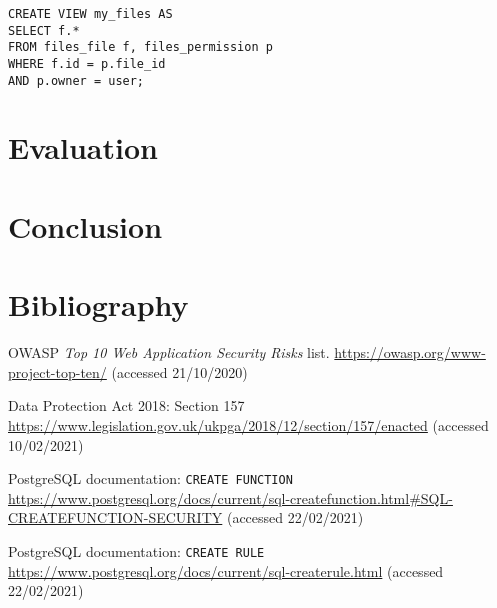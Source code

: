\documentclass{article}
\begin{document}
\begin{verbatim}
CREATE VIEW my_files AS
SELECT f.*
FROM files_file f, files_permission p
WHERE f.id = p.file_id
AND p.owner = user;
\end{verbatim}

\section{Evaluation}

\section{Conclusion}

\section*{Bibliography}
\begin{thebibliography}{9}
 OWASP \textit{Top 10 Web Application Security Risks} list. \url{https://owasp.org/www-project-top-ten/} (accessed 21/10/2020)

 Data Protection Act 2018: Section 157 \url{https://www.legislation.gov.uk/ukpga/2018/12/section/157/enacted} (accessed 10/02/2021)

 PostgreSQL documentation: \texttt{CREATE FUNCTION} \url{https://www.postgresql.org/docs/current/sql-createfunction.html#SQL-CREATEFUNCTION-SECURITY} (accessed 22/02/2021)

 PostgreSQL documentation: \texttt{CREATE RULE} \url{https://www.postgresql.org/docs/current/sql-createrule.html} (accessed 22/02/2021)
\end{thebibliography}
\end{document}
